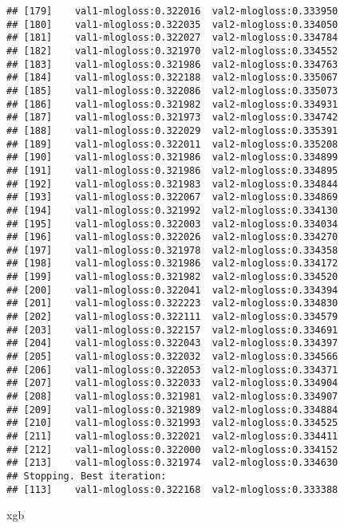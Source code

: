 \documentclass[]{article}
\newenvironment{Shaded}{\begin{snugshade}}{\end{snugshade}}
\newcommand{\NormalTok}[1]{#1}
\begin{document}
\begin{verbatim}
## [179]    val1-mlogloss:0.322016  val2-mlogloss:0.333950 
## [180]    val1-mlogloss:0.322035  val2-mlogloss:0.334050 
## [181]    val1-mlogloss:0.322027  val2-mlogloss:0.334784 
## [182]    val1-mlogloss:0.321970  val2-mlogloss:0.334552 
## [183]    val1-mlogloss:0.321986  val2-mlogloss:0.334763 
## [184]    val1-mlogloss:0.322188  val2-mlogloss:0.335067 
## [185]    val1-mlogloss:0.322086  val2-mlogloss:0.335073 
## [186]    val1-mlogloss:0.321982  val2-mlogloss:0.334931 
## [187]    val1-mlogloss:0.321973  val2-mlogloss:0.334742 
## [188]    val1-mlogloss:0.322029  val2-mlogloss:0.335391 
## [189]    val1-mlogloss:0.322011  val2-mlogloss:0.335208 
## [190]    val1-mlogloss:0.321986  val2-mlogloss:0.334899 
## [191]    val1-mlogloss:0.321986  val2-mlogloss:0.334895 
## [192]    val1-mlogloss:0.321983  val2-mlogloss:0.334844 
## [193]    val1-mlogloss:0.322067  val2-mlogloss:0.334869 
## [194]    val1-mlogloss:0.321992  val2-mlogloss:0.334130 
## [195]    val1-mlogloss:0.322003  val2-mlogloss:0.334034 
## [196]    val1-mlogloss:0.322026  val2-mlogloss:0.334270 
## [197]    val1-mlogloss:0.321978  val2-mlogloss:0.334358 
## [198]    val1-mlogloss:0.321986  val2-mlogloss:0.334172 
## [199]    val1-mlogloss:0.321982  val2-mlogloss:0.334520 
## [200]    val1-mlogloss:0.322041  val2-mlogloss:0.334394 
## [201]    val1-mlogloss:0.322223  val2-mlogloss:0.334830 
## [202]    val1-mlogloss:0.322111  val2-mlogloss:0.334579 
## [203]    val1-mlogloss:0.322157  val2-mlogloss:0.334691 
## [204]    val1-mlogloss:0.322043  val2-mlogloss:0.334397 
## [205]    val1-mlogloss:0.322032  val2-mlogloss:0.334566 
## [206]    val1-mlogloss:0.322053  val2-mlogloss:0.334371 
## [207]    val1-mlogloss:0.322033  val2-mlogloss:0.334904 
## [208]    val1-mlogloss:0.321981  val2-mlogloss:0.334907 
## [209]    val1-mlogloss:0.321989  val2-mlogloss:0.334884 
## [210]    val1-mlogloss:0.321993  val2-mlogloss:0.334525 
## [211]    val1-mlogloss:0.322021  val2-mlogloss:0.334411 
## [212]    val1-mlogloss:0.322000  val2-mlogloss:0.334152 
## [213]    val1-mlogloss:0.321974  val2-mlogloss:0.334630 
## Stopping. Best iteration:
## [113]    val1-mlogloss:0.322168  val2-mlogloss:0.333388
\end{verbatim}

\begin{Shaded}
\begin{Highlighting}[]
\NormalTok{xgb}
\end{Highlighting}
\end{Shaded}
\end{document}
